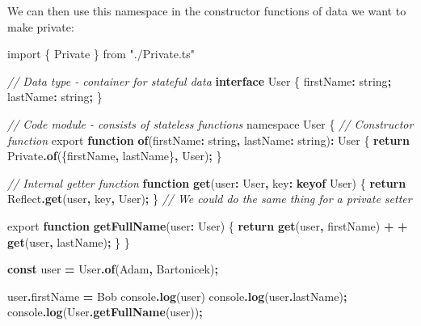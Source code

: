 \documentclass[
]{book}
\newenvironment{Shaded}{\begin{snugshade}}{\end{snugshade}}
\newcommand{\AttributeTok}[1]{\textcolor[rgb]{0.13,0.29,0.53}{#1}}
\newcommand{\BuiltInTok}[1]{#1}
\newcommand{\CommentTok}[1]{\textcolor[rgb]{0.56,0.35,0.01}{\textit{#1}}}
\newcommand{\ControlFlowTok}[1]{\textcolor[rgb]{0.13,0.29,0.53}{\textbf{#1}}}
\newcommand{\DataTypeTok}[1]{\textcolor[rgb]{0.13,0.29,0.53}{#1}}
\newcommand{\FunctionTok}[1]{\textcolor[rgb]{0.13,0.29,0.53}{\textbf{#1}}}
\newcommand{\ImportTok}[1]{#1}
\newcommand{\KeywordTok}[1]{\textcolor[rgb]{0.13,0.29,0.53}{\textbf{#1}}}
\newcommand{\NormalTok}[1]{#1}
\newcommand{\OperatorTok}[1]{\textcolor[rgb]{0.81,0.36,0.00}{\textbf{#1}}}
\newcommand{\StringTok}[1]{\textcolor[rgb]{0.31,0.60,0.02}{#1}}
\newcommand{\VerbatimStringTok}[1]{\textcolor[rgb]{0.31,0.60,0.02}{#1}}
\theoremstyle{definition}
\theoremstyle{definition}
\theoremstyle{definition}
\theoremstyle{definition}
\theoremstyle{remark}
\begin{document}
We can then use this namespace in the constructor functions of data we want to make private:

\begin{Shaded}
\begin{Highlighting}[]
\ImportTok{import}\NormalTok{ \{ Private \} }\ImportTok{from} \StringTok{"./Private.ts"}

\CommentTok{// Data type {-} container for stateful data}
\KeywordTok{interface}\NormalTok{ User \{}
\NormalTok{  firstName}\OperatorTok{:} \DataTypeTok{string}\OperatorTok{;}
\NormalTok{  lastName}\OperatorTok{:} \DataTypeTok{string}\OperatorTok{;}
\NormalTok{\}}

\CommentTok{// Code module {-} consists of stateless functions}
\ImportTok{namespace} \DataTypeTok{User}\NormalTok{ \{}
  \CommentTok{// Constructor function}
  \ImportTok{export} \KeywordTok{function} \KeywordTok{of}\NormalTok{(firstName}\OperatorTok{:} \DataTypeTok{string}\OperatorTok{,}\NormalTok{ lastName}\OperatorTok{:} \DataTypeTok{string}\NormalTok{)}\OperatorTok{:}\NormalTok{ User \{}
    \ControlFlowTok{return}\NormalTok{ Private}\OperatorTok{.}\FunctionTok{of}\NormalTok{(\{firstName}\OperatorTok{,}\NormalTok{ lastName\}}\OperatorTok{,}\NormalTok{ User)}\OperatorTok{;}
\NormalTok{  \}}
  
  \CommentTok{// Internal getter function}
  \KeywordTok{function} \KeywordTok{get}\NormalTok{(user}\OperatorTok{:}\NormalTok{ User}\OperatorTok{,}\NormalTok{ key}\OperatorTok{:} \KeywordTok{keyof}\NormalTok{ User) \{}
    \ControlFlowTok{return} \BuiltInTok{Reflect}\OperatorTok{.}\FunctionTok{get}\NormalTok{(user}\OperatorTok{,}\NormalTok{ key}\OperatorTok{,}\NormalTok{ User)}\OperatorTok{;}
\NormalTok{  \}}
  \CommentTok{// We could do the same thing for a private setter}
  
  \ImportTok{export} \KeywordTok{function} \FunctionTok{getFullName}\NormalTok{(user}\OperatorTok{:}\NormalTok{ User) \{}
    \ControlFlowTok{return} \KeywordTok{get}\NormalTok{(user}\OperatorTok{,} \VerbatimStringTok{\textasciigrave{}firstName\textasciigrave{}}\NormalTok{) }\OperatorTok{+} \VerbatimStringTok{\textasciigrave{} \textasciigrave{}} \OperatorTok{+} \KeywordTok{get}\NormalTok{(user}\OperatorTok{,} \VerbatimStringTok{\textasciigrave{}lastName\textasciigrave{}}\NormalTok{)}\OperatorTok{;}
\NormalTok{  \}}
\NormalTok{\}}

\KeywordTok{const}\NormalTok{ user }\OperatorTok{=}\NormalTok{ User}\OperatorTok{.}\FunctionTok{of}\NormalTok{(}\VerbatimStringTok{\textasciigrave{}Adam\textasciigrave{}}\OperatorTok{,} \VerbatimStringTok{\textasciigrave{}Bartonicek\textasciigrave{}}\NormalTok{)}\OperatorTok{;}

\NormalTok{user}\OperatorTok{.}\AttributeTok{firstName} \OperatorTok{=} \VerbatimStringTok{\textasciigrave{}Bob\textasciigrave{}}
\BuiltInTok{console}\OperatorTok{.}\FunctionTok{log}\NormalTok{(user)}
\BuiltInTok{console}\OperatorTok{.}\FunctionTok{log}\NormalTok{(user}\OperatorTok{.}\AttributeTok{lastName}\NormalTok{)}\OperatorTok{;}
\BuiltInTok{console}\OperatorTok{.}\FunctionTok{log}\NormalTok{(User}\OperatorTok{.}\FunctionTok{getFullName}\NormalTok{(user))}\OperatorTok{;}
\end{Highlighting}
\end{Shaded}
\end{document}
